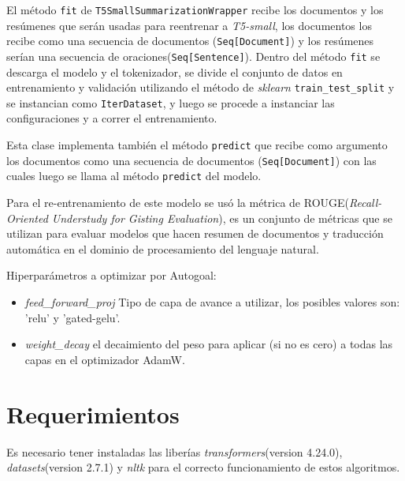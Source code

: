 El método \texttt{fit} de \texttt{T5SmallSummarizationWrapper} recibe los documentos y los resúmenes que serán usadas para reentrenar a \textit{T5-small}, los documentos los recibe como una secuencia de documentos (\texttt{Seq[Document]}) y los resúmenes serían una secuencia de oraciones(\texttt{Seq[Sentence]}). Dentro del método \texttt{fit} se descarga el modelo y el tokenizador, se divide el conjunto de datos en entrenamiento y validación utilizando el método de \textit{sklearn} \texttt{train\_test\_split} y se instancian como \texttt{IterDataset}, y luego se procede a instanciar las configuraciones y a correr el entrenamiento.

Esta clase implementa también el método \texttt{predict} que recibe como argumento los documentos como una secuencia de documentos (\texttt{Seq[Document]}) con las cuales luego se llama al método \texttt{predict} del modelo.

Para el re-entrenamiento de este modelo se usó la métrica de ROUGE(\textit{Recall-Oriented Understudy for Gisting Evaluation}), es un conjunto de métricas que se utilizan para evaluar modelos que hacen resumen de documentos y traducción automática en el dominio de procesamiento del lenguaje natural.

Hiperparámetros a optimizar por Autogoal:
\begin{itemize}
    \item \textit{feed\_forward\_proj} Tipo de capa de avance a utilizar, los posibles valores son: 'relu' y 'gated-gelu'.
    \item \textit{weight\_decay} el decaimiento del peso para aplicar (si no es cero) a todas las capas en el optimizador AdamW.
\end{itemize}

\section{Requerimientos}
Es necesario tener instaladas las liberías \textit{transformers}(version 4.24.0), \textit{datasets}(version 2.7.1) y \textit{nltk} para el correcto funcionamiento de estos algoritmos.